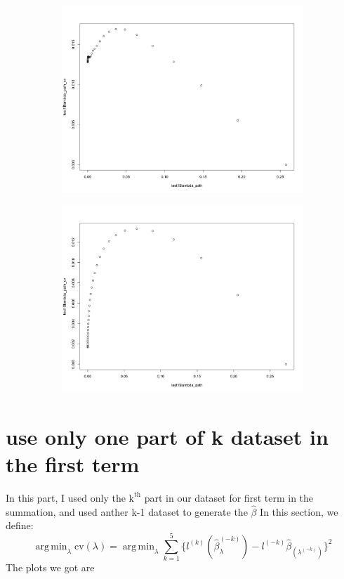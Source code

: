 \documentclass[letterpaper]{article}
\DeclareMathOperator*{\argmin}{arg\,min}
\begin{document}
\begin{figure}[H]
\centering
\begin{subfigure}{0.5\textwidth}
  \centering
  \includegraphics[width=1\linewidth]{./result_plot/fix_k/9wrong_path_plot}
\end{subfigure}%
\begin{subfigure}{.5\textwidth}
  \centering
  \includegraphics[width=1\linewidth]{./result_plot/fix_k/10wrong_path_plot}
\end{subfigure}

\end{figure}


\section{use only one part of k dataset in the first term}
\label{sec:k}
In this part, I used only the $\text{k}^{\text{th}}$ part in our dataset for first term in the summation, and used anther k-1 dataset to generate the $\hat{\beta}$  
In this section, we define:
$$
\argmin_{\lambda}\text{cv}(\lambda)=\argmin_{\lambda}\sum_{k=1}^5\{l^{(k)}(\hat{\beta}_\lambda^{(-k)})-l^{(-k)}\hat{\beta}_(\lambda^{(-k)})\}^2
$$
The plots we got are
\end{document}
